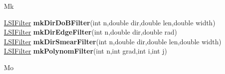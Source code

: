 \documentclass[10pt,titlepage]{article}
\def\functionlistentry#1#2#3#4#5#6{\noindent #1 {\bf #2}(#3) \dotfill #6\\}
\def\letterref#1{}
\def\letterlabel#1{\vspace{0.5cm}\centerline{\Large #1}}
\def\letterlabelend#1{}
\begin{document}
{{\letterlabel{Mk}
\letterref{A}
\letterref{B}
\letterref{C}
\letterref{D}
\letterref{E}
\letterref{F}
\letterref{G}
\letterref{H}
\letterref{I}
\letterref{K}
\letterref{L}
\letterref{M}
\letterref{N}
\letterref{O}
\letterref{P}
\letterref{Q}
\letterref{R}
\letterref{S}
\letterref{T}
\letterref{U}
\letterref{V}
\letterref{W}
\letterref{X}
\letterref{Y}
\letterref{Z}

\letterref{Ma}
\letterref{Me}
\letterref{Mi}
\letterref{Mk}
\letterref{Mo}
\letterref{Mp}
\letterref{Mu}
\letterlabelend{Mk}
\functionlistentry{\hyperlink{LSIFilter}{LSIFilter}}{mkDirDoBFilter}{int n,double dir,double len,double width}{328}{filter}{}
\functionlistentry{\hyperlink{LSIFilter}{LSIFilter}}{mkDirEdgeFilter}{int n,double dir,double rad}{329}{filter}{}
\functionlistentry{\hyperlink{LSIFilter}{LSIFilter}}{mkDirSmearFilter}{int n,double dir,double len,double width}{327}{filter}{}
\functionlistentry{\hyperlink{LSIFilter}{LSIFilter}}{mkPolynomFilter}{int n,int grad,int i,int j}{326}{filter}{}

\letterlabel{Mo}
\letterref{A}
\letterref{B}
\letterref{C}
\letterref{D}
\letterref{E}
\letterref{F}
\letterref{G}
\letterref{H}
\letterref{I}
\letterref{K}
\letterref{L}
\letterref{M}
\letterref{N}
\letterref{O}
\letterref{P}
\letterref{Q}
\letterref{R}
\letterref{S}
\letterref{T}
\letterref{U}
\letterref{V}
\letterref{W}
\letterref{X}
\letterref{Y}
\letterref{Z}

}}
\end{document}
